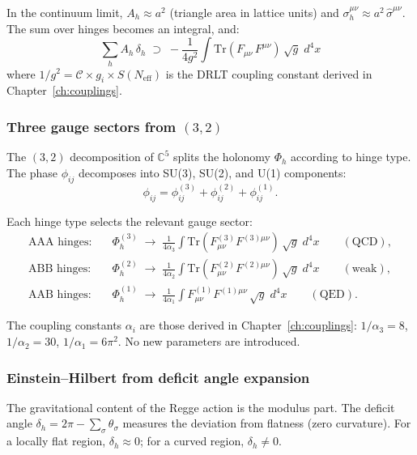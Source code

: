 \documentclass[12pt]{article}
\theoremstyle{remark}
\theoremstyle{definition}
\newcommand{\CC}{\mathbb{C}}
\begin{document}
In the continuum limit, $A_h \approx a^2$ (triangle area in lattice units) and $\sigma^{\mu\nu}_h \approx a^2\,\hat{\sigma}^{\mu\nu}$.  The sum over hinges becomes an integral, and:
\begin{equation}
\boxed{\sum_h A_h\,\delta_h \;\supset\; -\frac{1}{4g^2}\int \text{Tr}(F_{\mu\nu}\,F^{\mu\nu})\,\sqrt{g}\;d^4x}
\end{equation}
where $1/g^2 = \mathcal{C} \times g_i \times S(N_\text{eff})$ is the DRLT coupling constant derived in Chapter~\ref{ch:couplings}.

\subsubsection{Three gauge sectors from $(3,2)$}

The $(3,2)$ decomposition of $\CC^5$ splits the holonomy $\Phi_h$ according to hinge type.  The phase $\phi_{ij}$ decomposes into SU(3), SU(2), and U(1) components:
\begin{equation}
\phi_{ij} = \phi^{(3)}_{ij} + \phi^{(2)}_{ij} + \phi^{(1)}_{ij}.
\end{equation}

Each hinge type selects the relevant gauge sector:
\begin{align}
\text{AAA hinges:} &\quad \Phi^{(3)}_h \;\to\; \frac{1}{4\alpha_3}\int\text{Tr}(F^{(3)}_{\mu\nu}F^{(3)\mu\nu})\,\sqrt{g}\;d^4x \qquad (\text{QCD}), \\
\text{ABB hinges:} &\quad \Phi^{(2)}_h \;\to\; \frac{1}{4\alpha_2}\int\text{Tr}(F^{(2)}_{\mu\nu}F^{(2)\mu\nu})\,\sqrt{g}\;d^4x \qquad (\text{weak}), \\
\text{AAB hinges:} &\quad \Phi^{(1)}_h \;\to\; \frac{1}{4\alpha_1}\int F^{(1)}_{\mu\nu}F^{(1)\mu\nu}\,\sqrt{g}\;d^4x \qquad (\text{QED}).
\end{align}

The coupling constants $\alpha_i$ are those derived in Chapter~\ref{ch:couplings}: $1/\alpha_3 = 8$, $1/\alpha_2 = 30$, $1/\alpha_1 = 6\pi^2$.  No new parameters are introduced.

\subsubsection{Einstein--Hilbert from deficit angle expansion}

The gravitational content of the Regge action is the modulus part.  The deficit angle $\delta_h = 2\pi - \sum_\sigma \theta_\sigma$ measures the deviation from flatness (zero curvature).  For a locally flat region, $\delta_h \approx 0$; for a curved region, $\delta_h \ne 0$.
\end{document}
